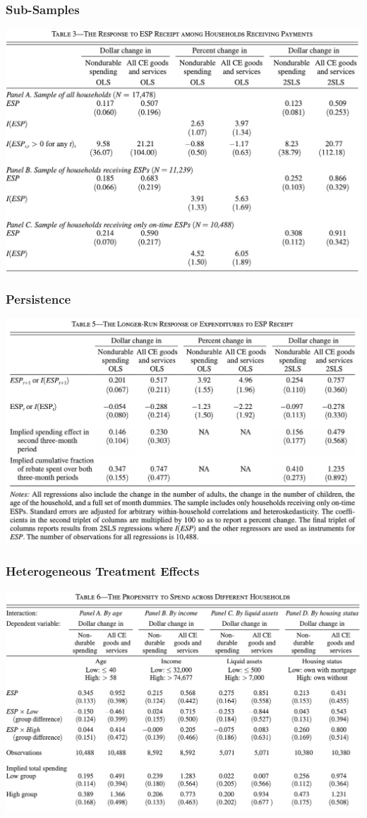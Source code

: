 \documentclass[english,xcolor=svgnames]{beamer}
\begin{document}
\begin{frame}
\frametitle[alignment=center]{Sub-Samples}
\centering
\includegraphics[scale=0.6]{figures/PSMJTAB3.png}
\end{frame}

\begin{frame}
\frametitle[alignment=center]{Persistence}
\centering
\includegraphics[scale=0.6]{figures/PSMJTAB5.png}
\end{frame}


\begin{frame}
\frametitle[alignment=center]{Heterogeneous Treatment Effects}
\centering
\includegraphics[scale=0.6]{figures/PSMJTAB6.png}
\end{frame}
\end{document}
